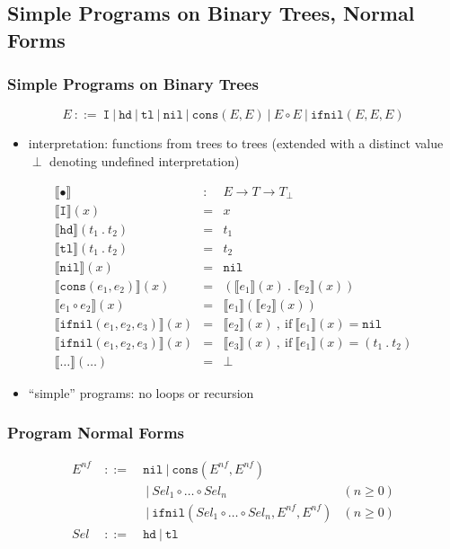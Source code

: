 \documentclass{beamer}
\begin{document}
\subsection{Simple Programs on Binary Trees, Normal Forms}

\begin{frame}
  \frametitle{Simple Programs on Binary Trees}
  \[ E ~::=~ \texttt{I} ~|~ \texttt{hd} ~|~ \texttt{tl} ~|~ \texttt{nil}
       ~|~ \texttt{cons}(E, E)
       ~|~ E \circ E
       ~|~ \texttt{ifnil}(E, E, E)  \]
  \begin{itemize}
    \item interpretation: functions from trees to trees 
      (extended with a distinct value $\perp$ denoting undefined interpretation)
  \end{itemize}
  \[
    \begin{array}{lcl}
    \llbracket \bullet \rrbracket & : & E \rightarrow T \rightarrow T_{\perp} \\
    \llbracket \texttt{I} \rrbracket(x) & = & x \\
    \llbracket \texttt{hd} \rrbracket(t_1 ~.~ t_2) & = & t_1 \\
    \llbracket \texttt{tl} \rrbracket(t_1 ~.~ t_2) & = & t_2 \\
    \llbracket \texttt{nil} \rrbracket(x) & = & \texttt{nil} \\
    \llbracket \texttt{cons}(e_1, e_2) \rrbracket(x) & = & 
        (\llbracket e_1 \rrbracket(x) ~.~ \llbracket e_2 \rrbracket(x)) \\
    \llbracket e_1 \circ e_2 \rrbracket(x) & = & 
        \llbracket e_1 \rrbracket(\llbracket e_2 \rrbracket(x)) \\
    \llbracket \texttt{ifnil}(e_1, e_2, e_3) \rrbracket(x) & = & 
        \llbracket e_2 \rrbracket(x) ~,~ \text{if} ~ \llbracket e_1 \rrbracket(x) = \texttt{nil} \\
    \llbracket \texttt{ifnil}(e_1, e_2, e_3) \rrbracket(x) & = & 
        \llbracket e_3 \rrbracket(x) ~,~ \text{if} ~ \llbracket e_1 \rrbracket(x) = (t_1 ~.~ t_2) \\
    \llbracket \ldots \rrbracket(\ldots) & = & \perp
    \end{array}  
  \]
  \begin{itemize}
    \item ``simple'' programs: no loops or recursion
  \end{itemize}
\end{frame}

\begin{frame}
  \frametitle{Program Normal Forms}
  \[\begin{array}{lclr}
  E^{nf} & ~::=~ & \texttt{nil} ~|~ \texttt{cons}(E^{nf}, E^{nf}) & \\
         &       & ~|~ \mathit{Sel}_1 \circ \ldots \circ \mathit{Sel}_n & (n \ge 0) \\
         &       & ~|~ \texttt{ifnil}(\mathit{Sel}_1 \circ \ldots \circ \mathit{Sel}_n, E^{nf}, E^{nf}) & (n \ge 0) \\
  \mathit{Sel} & ~::=~ & \texttt{hd} ~|~ \texttt{tl} & 
  \end{array}
  \]
  
\end{frame}
\end{document}
